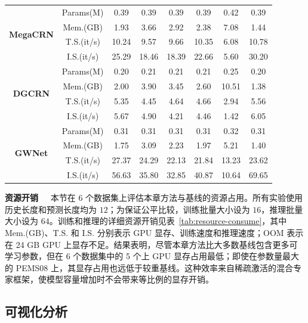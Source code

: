 \begin{table}[h!]
{\begin{tabular}{cc|cccccc}
         \midrule
         \multirow{4}{*}{\textbf{MegaCRN}} & Params(M) & 0.39 & 0.39 & 0.39 & 0.39 & 0.42 & 0.39 \\
         & Mem.(GB) & 1.93 & 3.66 & 2.92 & 2.38 & 7.08 & 1.44 \\
         & T.S.(it/s) & 10.24 & 9.57 & 9.66 & 10.35 & 6.08 & 10.78 \\
         & I.S.(it/s) & 25.29 & 18.46 & 18.39 & 22.66 & 5.60 & 30.20 \\

         \midrule
         \multirow{4}{*}{\textbf{DGCRN}} & Params(M) & 0.20 & 0.21 & 0.21 & 0.21 & 0.25 & 0.20 \\
         & Mem.(GB) & 2.00 & 3.90 & 3.45 & 2.60 & 10.51 & 1.38 \\
         & T.S.(it/s) & 5.35 & 4.45 & 4.64 & 4.66 & 2.94 & 5.56 \\
         & I.S.(it/s) & 5.67 & 4.90 & 4.21 & 4.46 & 1.42 & 6.05 \\

         \midrule
         \multirow{4}{*}{\textbf{GWNet}} & Params(M) & 0.31 & 0.31 & 0.31 & 0.31 & 0.32 & 0.31 \\
         & Mem.(GB) & 1.75 & 3.09 & 2.23 & 1.97 & 5.21 & 1.40 \\
         & T.S.(it/s) & 27.37 & 24.29 & 22.13 & 21.84 & 13.23 & 23.62 \\
         & I.S.(it/s) & 56.63 & 35.80 & 32.85 & 40.87 & 10.64 & 69.65 \\
         \bottomrule
    \end{tabular}
    }
\end{table}

\noindent\textbf{资源开销\ \ } 本节在 6 个数据集上评估本章方法与基线的资源占用。所有实验使用历史长度和预测长度均为 $12$；为保证公平比较，训练批量大小设为 $16$，推理批量大小设为 $64$。训练和推理的详细资源开销见表~\ref{tab:resource-consume}，其中 Mem.(GB)、T.S. 和 I.S. 分别表示 GPU 显存、训练速度和推理速度；OOM 表示在 24 GB GPU 上显存不足。结果表明，尽管本章方法比大多数基线包含更多可学习参数，但在 6 个数据集中的 5 个上 GPU 显存占用最低；即使在参数量最大的 PEMS08 上，其显存占用也远低于较重基线。这种效率来自稀疏激活的混合专家框架，使模型容量增加时不会带来等比例的显存开销。

\subsection{可视化分析}


